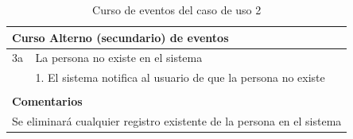 \begin{table}[hp!]
{\begin{tabular}{|l|l|l|l|}
        \hline
        \multicolumn{4}{|l|}{{\cellcolor[rgb]{0.886,0.886,0.886}}\textbf{Curso Alterno (secundario) de eventos}}                                                                                                                                                                                        \\ 
        \hline
        3a & \multicolumn{3}{l|}{La persona no existe en el sistema}                                                                                                                                                                                                                                    \\ 
        \hline
        & \multicolumn{3}{l|}{1. El sistema notifica al usuario de que la persona no existe}                                                                                                                                                                                                         \\ 
        \hline
        \multicolumn{4}{l}{}                                                                                                                                                                                                                                                                            \\ 
        \hline
        \multicolumn{4}{|l|}{{\cellcolor[rgb]{0.886,0.886,0.886}}\textbf{Comentarios}}                                                                                                                                                                                                                  \\ 
        \hline
        \multicolumn{4}{|l|}{Se eliminará cualquier registro existente de la persona en el sistema}                                                                                                                                                                                                     \\
        \hline
        \end{tabular}
    }
    \caption{Curso de eventos del caso de uso 2}
\end{table}

